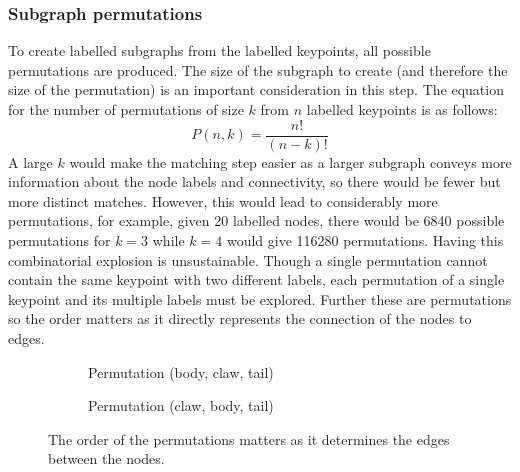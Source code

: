 \subsubsection{Subgraph permutations}
To create labelled subgraphs from the labelled keypoints, all possible permutations are produced. The size of the subgraph to create (and therefore the size of the permutation) is an important consideration in this step. The equation for the number of permutations of size $k$ from $n$ labelled keypoints is as follows:
\begin{equation}
P(n, k) = \frac{n!}{(n-k)!}
\end{equation}
A large $k$ would make the matching step easier as a larger subgraph conveys more information about the node labels and connectivity, so there would be fewer but more distinct matches. However, this would lead to considerably more permutations, for example, given 20 labelled nodes, there would be 6840 possible permutations for $k=3$ while $k=4$ would give 116280 permutations. Having this combinatorial explosion is unsustainable. Though a single permutation cannot contain the same keypoint with two different labels, each permutation of a single keypoint and its multiple labels must be explored. Further these are permutations so the order matters as it directly represents the connection of the nodes to edges.
\begin{figure}[H]
\centering
	\begin{subfigure}{0.45\textwidth}
	\centering
	\caption{Permutation (body, claw, tail)}
	\end{subfigure}
	\hspace*{\fill}
	\begin{subfigure}{0.45\textwidth}
	\centering
	\caption{Permutation (claw, body, tail)}
	\end{subfigure}
\caption{The order of the permutations matters as it determines the edges between the nodes.}
\end{figure}
